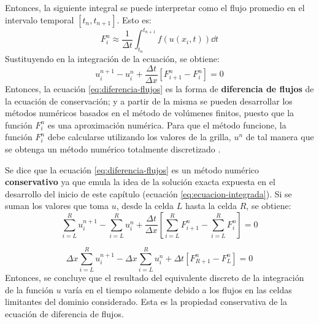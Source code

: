 \documentclass[12pt]{article}
\begin{document}
	Entonces, la siguiente integral se puede interpretar como el flujo promedio en el intervalo temporal $[t_n,t_{n+1}]$. Esto es:
	\begin{equation}
		F_{i}^{n} \approx \frac{1}{\Delta t} \int_{t_n}^{t_{n+1}} f(u(x_i,t)) \dd{t}
		\label{eq:flujo_promedio}
	\end{equation}
	Sustituyendo en la integración de la ecuación, se obtiene:
	\begin{equation}
		u_{i}^{n+1} - u_{i}^{n} + \frac{\Delta t}{\Delta x}\left[ F_{i+1}^n - F_{i}^{n}\right] = 0
		\label{eq:diferencia-flujos}
	\end{equation}
	Entonces, la ecuación \ref{eq:diferencia-flujos} es la forma de \textbf{diferencia de flujos} de la ecuación de conservación; y a partir de la misma se pueden desarrollar los métodos numéricos basados en el método de volúmenes finitos, puesto que la función $F_{i}^{n}$ es una aproximación numérica. Para que el método funcione, la función $F_{i}^{n}$ debe calcularse utilizando los valores de la grilla, $u^{n}$ de tal manera que se obtenga un método numérico totalmente discretizado \cite{LeVeque1998}. 
	
	Se dice que la ecuación \ref{eq:diferencia-flujos} es un método numérico \textbf{conservativo} ya que emula la idea de la solución exacta expuesta en el desarrollo del inicio de este capítulo (ecuación \ref{eq:ecuacion-integrada}). Si se suman los valores que toma $u$, desde la celda $L$ hasta la celda $R$, se obtiene:
	\begin{equation}
		\sum_{i=L}^{R} u_{i}^{n+1} - \sum_{i=L}^{R}  u_{i}^{n} + \frac{\Delta t}{\Delta x}\left[ \sum_{i=L}^{R}F_{i+1}^{n} - \sum_{i=L}^{R}F_{i}^{n}\right] =0
	\end{equation}
		
	\begin{equation}
		{\Delta x}\sum_{i=L}^{R} u_{i}^{n+1} - {\Delta x}\sum_{i=L}^{R}  u_{i}^{n} + {\Delta t}\left[ F_{R+1}^{n} - F_{L}^{n} \right] =0
	\end{equation}
	Entonces, se concluye que el resultado del equivalente discreto de la integración de la función $u$ varía en el tiempo solamente debido a los flujos en las celdas limitantes del dominio considerado. Esta es la propiedad conservativa de la ecuación de diferencia de flujos.
	
\end{document}
